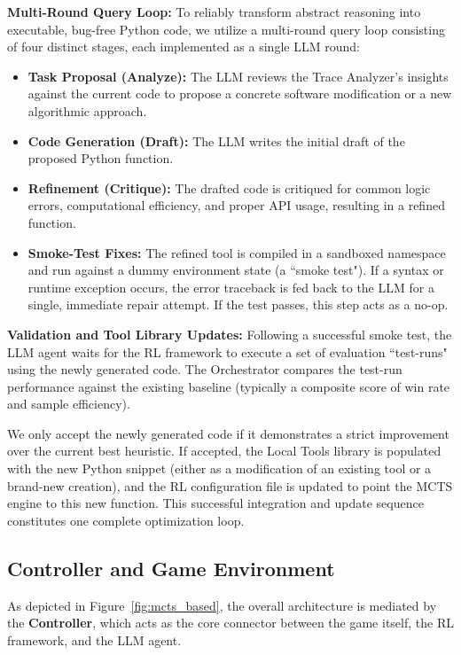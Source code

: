 \documentclass{article}
\begin{document}
\textbf{Multi-Round Query Loop:} To reliably transform abstract reasoning into executable, bug-free Python code, we utilize a multi-round query loop consisting of four distinct stages, each implemented as a single LLM round:
\begin{itemize}
    \item \textbf{Task Proposal (Analyze):} The LLM reviews the Trace Analyzer's insights against the current code to propose a concrete software modification or a new algorithmic approach.
    \item \textbf{Code Generation (Draft):} The LLM writes the initial draft of the proposed Python function.
    \item \textbf{Refinement (Critique):} The drafted code is critiqued for common logic errors, computational efficiency, and proper API usage, resulting in a refined function.
    \item \textbf{Smoke-Test Fixes:} The refined tool is compiled in a sandboxed namespace and run against a dummy environment state (a ``smoke test"). If a syntax or runtime exception occurs, the error traceback is fed back to the LLM for a single, immediate repair attempt. If the test passes, this step acts as a no-op.
\end{itemize}

\textbf{Validation and Tool Library Updates:} Following a successful smoke test, the LLM agent waits for the RL framework to execute a set of evaluation ``test-runs" using the newly generated code. The Orchestrator compares the test-run performance against the existing baseline (typically a composite score of win rate and sample efficiency). 

We only accept the newly generated code if it demonstrates a strict improvement over the current best heuristic. If accepted, the Local Tools library is populated with the new Python snippet (either as a modification of an existing tool or a brand-new creation), and the RL configuration file is updated to point the MCTS engine to this new function. This successful integration and update sequence constitutes one complete optimization loop.

\subsection{Controller and Game Environment}
\label{sec:method_controller}

As depicted in Figure~\ref{fig:mcts_based}, the overall architecture is mediated by the \textbf{Controller}, which acts as the core connector between the game itself, the RL framework, and the LLM agent. 
\end{document}
